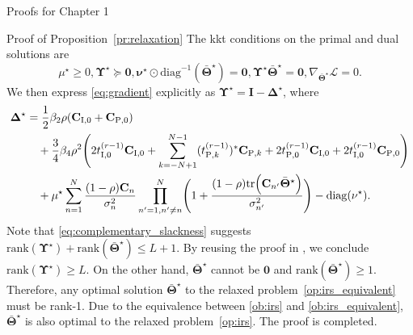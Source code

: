 \begin{section}{Proofs for Chapter 1}
\begin{subsection}{Proof of Proposition~\ref{pr:relaxation}}
		The \gls{kkt} conditions on the primal and dual solutions are
		\begin{subequations}
			\begin{equation}\label{eq:lagrange_multiplier}
				\mu^\star \ge 0, \mathbf{\Upsilon}^\star \succeq \mathbf{0},
			\end{equation}
			\begin{equation}\label{eq:complementary_slackness}
				\mathbf{\nu}^\star \odot \mathrm{diag}^{-1}(\bar{\mathbf{\Theta}}^\star) = \mathbf{0}, \mathbf{\Upsilon}^\star \bar{\mathbf{\Theta}}^\star = \mathbf{0},
			\end{equation}
			\begin{equation}\label{eq:gradient}
				\nabla_{\bar{\mathbf{\Theta}}^\star} \mathcal{L} = 0.
			\end{equation}
		\end{subequations}
		We then express \eqref{eq:gradient} explicitly as $\mathbf{\Upsilon}^\star = \mathbf{I} - \mathbf{\Delta}^\star$, where
		\begin{equation}
			\begin{split}\label{eq:delta}
				\mathbf{\Delta}^\star
				& = \frac{1}{2} \beta_2 \rho (\mathbf{C}_{\mathrm{I},0}+\mathbf{C}_{\mathrm{P},0})\\
				& \quad + \frac{3}{4} \beta_4 \rho^2
					\Biggl(
						2 t_{\mathrm{I},0}^{(r-1)} \mathbf{C}_{\mathrm{I},0} + \sum_{k=-N+1}^{N-1} (t_{\mathrm{P},k}^{(r-1)})^* \mathbf{C}_{\mathrm{P},k} + 2 t_{\mathrm{P},0}^{(r-1)} \mathbf{C}_{\mathrm{I},0} + 2 t_{\mathrm{I},0}^{(r-1)} \mathbf{C}_{\mathrm{P},0}
					\Biggr)\\
				& \quad + \mu^\star \sum_{n=1}^N \frac{(1-\rho) \mathbf{C}_n}{\sigma_n^2} \prod_{n'=1,n' \ne n}^N \Biggl(
					1 + \frac{(1-\rho)\mathrm{tr}\Bigl(
						\mathbf{C}_{n'} \bar{\mathbf{\Theta}}^\star
					\Bigr)}{\sigma_{n'}^2}
				\Biggr) - \mathrm{diag}(\mathbf{\nu^\star}).
			\end{split}
		\end{equation}
		Note that \eqref{eq:complementary_slackness} suggests $\mathrm{rank}(\mathbf{\Upsilon}^\star)+\mathrm{rank}(\bar{\mathbf{\Theta}}^\star) \le L+1$. By reusing the proof in \cite[Appendix~A]{Xu2020}, we conclude $\mathrm{rank}(\mathbf{\Upsilon}^\star) \ge L$. On the other hand, $\bar{\mathbf{\Theta}}^\star$ cannot be $\mathbf{0}$ and $\mathrm{rank}(\bar{\mathbf{\Theta}}^\star) \ge 1$. Therefore, any optimal solution $\bar{\mathbf{\Theta}}^\star$ to the relaxed problem~\eqref{op:irs_equivalent} must be rank-\num{1}. Due to the equivalence between \eqref{ob:irs} and \eqref{ob:irs_equivalent}, $\bar{\mathbf{\Theta}}^\star$ is also optimal to the relaxed problem~\eqref{op:irs}. The proof is completed.
	\end{subsection}


\end{section}
